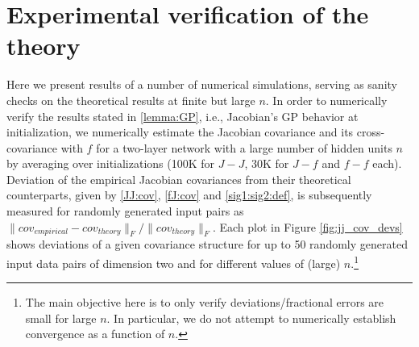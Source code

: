 \documentclass{article}
\theoremstyle{definition}
\theoremstyle{remark}
\renewcommand{\[}{\begin{eqnarray}}
\renewcommand{\]}{\end{eqnarray}}
\renewcommand{\[}{\begin{eqnarray}}
\renewcommand{\]}{\end{eqnarray}}
\begin{document}
\section{Experimental verification of the theory}\label{verify}
Here we present results of a number of numerical simulations, serving as sanity checks on the theoretical results at finite but large $n$.  In order to numerically verify the results stated in \cref{lemma:GP}, i.e., Jacobian's GP behavior at initialization, we numerically estimate the Jacobian covariance and its cross- covariance with $f$ for a two-layer  network with a large number of hidden units $n$ by averaging over initializations (100K for $J-J$, 30K for $J-f$ and $f-f$ each). Deviation of the empirical Jacobian covariances from their theoretical counterparts, given by \cref{JJ:cov}, \cref{fJ:cov} and \cref{sig1:sig2:def}, is subsequently measured for randomly generated input pairs as $\lVert cov_{empirical}-cov_{theory}\rVert_{F}/\lVert cov_{theory} \rVert_{F}$. Each plot in Figure \cref{fig:jj_cov_devs} shows deviations of a given covariance structure for up to 50 randomly generated input data pairs of dimension two and for different values of (large) $n$.\footnote{The main objective here is to only verify deviations/fractional errors are small for large $n$. In particular, we do not attempt to numerically establish convergence as a function of $n$.}
\end{document}
